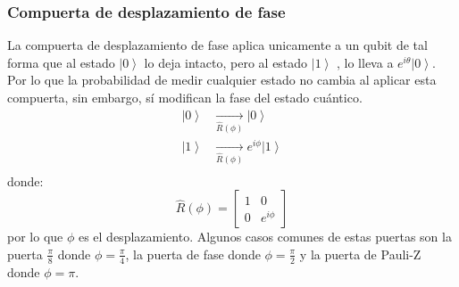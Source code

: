 \subsubsection{Compuerta de desplazamiento de fase}
La compuerta de desplazamiento de fase aplica unicamente a un qubit de tal forma que al estado $\left|0 \right\rangle$ lo deja intacto, pero al estado $\left|1 \right\rangle$ , lo lleva a $e^{i\theta}\left|0 \right\rangle$. Por lo que la probabilidad de medir 
cualquier estado no cambia al aplicar esta compuerta, sin embargo, sí modifican la fase del estado cuántico.
\begin{align*}
    \left| 0 \right\rangle &\underset{\hat{R}(\phi)}{\rightarrow} \left| 0 \right\rangle\\
    \left| 1\right\rangle &\underset{\hat{R}(\phi)}{\rightarrow} e^{i\phi}\left| 1\right\rangle\\
\end{align*}
    donde:
    \begin{equation*}
        \hat{R}(\phi) = \left[\begin{matrix}
            1 & 0 \\
            0 & e^{i\phi}
        \end{matrix} \right]
    \end{equation*}
    por lo que $\phi$ es el desplazamiento. Algunos casos comunes de estas puertas son la puerta $\frac{\pi}{8}$ donde $\phi=\frac{\pi}{4}$, la puerta de fase donde
    $\phi=\frac{\pi}{2}$ y la puerta de Pauli-Z donde $\phi=\pi$.
